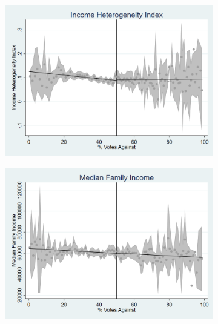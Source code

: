 \begin{figure}[ht]
    \vspace{1em}

    \begin{minipage}[b]{0.48\textwidth}
        \centering
        \begin{subfigure}[b]{\textwidth}
            \centering
            \includegraphics[width=\textwidth,keepaspectratio]{images/cov_smoothness_incherfindahl.png}
            \label{fig:incherfindahl_sm}
        \end{subfigure}
    \end{minipage}
    \hfill
    \begin{minipage}[b]{0.48\textwidth}
        \centering
        \begin{subfigure}[b]{\textwidth}
            \centering
            \includegraphics[width=\textwidth,keepaspectratio]{images/cov_smoothness_medfamy.png}
            \label{fig:medfamy_sm}
        \end{subfigure}
    \end{minipage}


\end{figure}
